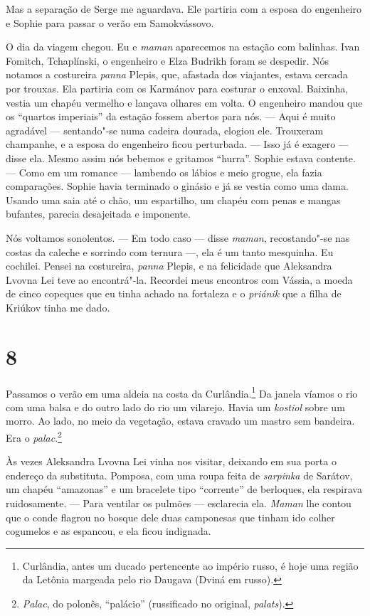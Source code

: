 Mas a separação de Serge me aguardava. Ele partiria com a esposa do
engenheiro e Sophie para passar o verão em Samokvássovo.

O dia da viagem chegou. Eu e \emph{maman} aparecemos na estação com
balinhas. Ivan Fomitch, Tchaplínski, o engenheiro e Elza Budrikh foram
se despedir. Nós notamos a costureira \emph{panna} Plepis, que, afastada
dos viajantes, estava cercada por trouxas. Ela partiria com os Karmánov
para costurar o enxoval. Baixinha, vestia um chapéu vermelho e lançava
olhares em volta. O engenheiro mandou que os ``quartos imperiais'' da
estação fossem abertos para nós. --- Aqui é muito agradável ---
sentando"-se numa cadeira dourada, elogiou ele. Trouxeram champanhe, e a
esposa do engenheiro ficou perturbada. --- Isso já é exagero --- disse
ela. Mesmo assim nós bebemos e gritamos ``hurra''. Sophie estava
contente. --- Como em um romance --- lambendo os lábios e meio grogue,
ela fazia comparações. Sophie havia terminado o ginásio e já se vestia
como uma dama. Usando uma saia até o chão, um espartilho, um chapéu com
penas e mangas bufantes, parecia desajeitada e imponente.

Nós voltamos sonolentos. --- Em todo caso --- disse \emph{maman},
recostando"-se nas costas da caleche e sorrindo com ternura ---, ela é um
tanto mesquinha. Eu cochilei. Pensei na costureira, \emph{panna} Plepis,
e na felicidade que Aleksandra Lvovna Lei teve ao encontrá"-la. Recordei
meus encontros com Vássia, a moeda de cinco copeques que eu tinha achado
na fortaleza e o \emph{priánik} que a filha de Kriúkov tinha me dado.

\section{8}

Passamos o verão em uma aldeia na costa da Curlândia.\footnote{Curlândia,
  antes um ducado pertencente ao império russo, é hoje uma região da
  Letônia margeada pelo rio Daugava (Dviná em russo).} Da janela víamos
o rio com uma balsa e do outro lado do rio um vilarejo. Havia um
\emph{kostiol} sobre um morro. Ao lado, no meio da vegetação, estava
cravado um mastro sem bandeira. Era o \emph{palac}.\footnote{\emph{Palac},
  do polonês, ``palácio'' (russificado no original, \emph{palats}).}

Às vezes Aleksandra Lvovna Lei vinha nos visitar, deixando em sua porta
o endereço da substituta. Pomposa, com uma roupa feita de
\emph{sarpinka} de Sarátov, um chapéu ``amazonas'' e um bracelete tipo
``corrente'' de berloques, ela respirava ruidosamente. --- Para ventilar
os pulmões --- esclarecia ela. \emph{Maman} lhe contou que o conde
flagrou no bosque dele duas camponesas que tinham ido colher cogumelos e
as espancou, e ela ficou indignada.

